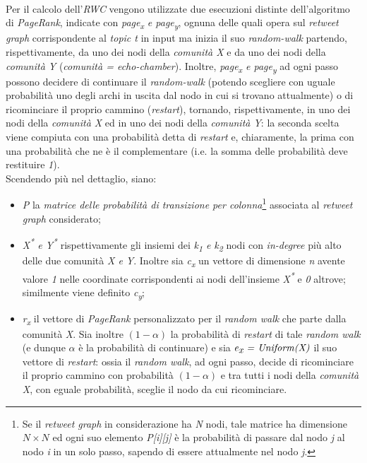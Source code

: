 \begin{enumerate}
\\Per il calcolo dell'\textit{RWC} vengono utilizzate due esecuzioni distinte dell'algoritmo di \textit{PageRank}, indicate con \textit{page\textsubscript{x} e page\textsubscript{y}}, ognuna delle quali opera sul \textit{retweet graph} corrispondente al \textit{topic t} in input ma inizia il suo \textit{random-walk} partendo, rispettivamente, da uno dei nodi della \textit{comunità X} e da uno dei nodi della \textit{comunità Y} (\textit{comunità = echo-chamber}). Inoltre, \textit{page\textsubscript{x} e page\textsubscript{y}} ad ogni passo possono decidere di continuare il \textit{random-walk} (potendo scegliere con uguale probabilità uno degli archi in uscita dal nodo in cui si trovano attualmente) o di ricominciare il proprio cammino (\textit{restart}), tornando, rispettivamente, in uno dei nodi della \textit{comunità X} ed in uno dei nodi della \textit{comunità Y}: la seconda scelta viene compiuta con una probabilità detta di \textit{restart} e, chiaramente, la prima con una probabilità che ne è il complementare (i.e. la somma delle probabilità deve restituire \textit{1}).
\\Scendendo più nel dettaglio, siano:
\begin{itemize}
\item \textit{P} la \textit{matrice delle probabilità di transizione per colonna}\footnote{Se il \textit{retweet graph} in considerazione ha \textit{N} nodi, tale matrice ha dimensione $N \times N$ ed ogni suo elemento \textit{P[i][j]} è la probabilità di passare dal nodo \textit{j} al nodo \textit{i} in un solo passo, sapendo di essere attualmente nel nodo \textit{j}.} associata al \textit{retweet graph} considerato;
\item \textit{X\textsuperscript{*} e Y\textsuperscript{*}} rispettivamente gli insiemi dei \textit{k\textsubscript{1} e k\textsubscript{2}} nodi con \textit{in-degree} più alto delle due comunità \textit{X e Y}. Inoltre sia \textit{c\textsubscript{x}} un vettore di dimensione \textit{n} avente valore \textit{1} nelle coordinate corrispondenti ai nodi dell'insieme \textit{X\textsuperscript{*}} e \textit{0} altrove; similmente viene definito \textit{c\textsubscript{y}};
\item \textit{r\textsubscript{x}} il vettore di \textit{PageRank} personalizzato per il \textit{random walk} che parte dalla comunità \textit{X}. Sia inoltre $(1-\alpha)$ la probabilità di \textit{restart} di tale \textit{random walk} (e dunque $\alpha$ è la probabilità di continuare) e sia $\textit{e\textsubscript{x} = Uniform(X)}$ il suo vettore di \textit{restart}: ossia il \textit{random walk}, ad ogni passo, decide di ricominciare il proprio cammino con probabilità $(1-\alpha)$ e tra tutti i nodi della \textit{comunità X}, con eguale probabilità, sceglie il nodo da cui ricominciare.

\end{itemize}
\end{enumerate}
